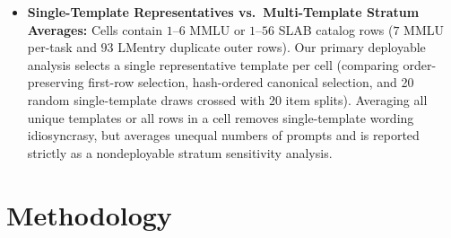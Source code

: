 \documentclass[11pt,a4paper]{article}
\begin{document}
\begin{itemize}[leftmargin=*,nosep]
    \item \textbf{Single-Template Representatives vs.\ Multi-Template Stratum Averages:} Cells contain $1$--$6$ MMLU or $1$--$56$ SLAB catalog rows ($7$ MMLU per-task and $93$ LMentry duplicate outer rows). Our primary deployable analysis selects a single representative template per cell (comparing order-preserving first-row selection, hash-ordered canonical selection, and 20 random single-template draws crossed with 20 item splits). Averaging all unique templates or all rows in a cell removes single-template wording idiosyncrasy, but averages unequal numbers of prompts and is reported strictly as a nondeployable stratum sensitivity analysis.
\end{itemize}

\section{Methodology}
\end{document}
